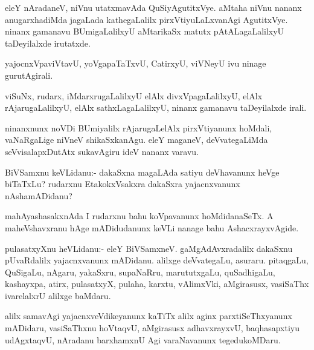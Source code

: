 \documentclass{article}
\begin{document}
\begin{mn}%
eleY nAradaneV, niVnu utatxmavAda QuSiyAgutitxVye. aMtaha niVnu nananx
anugarxhadiMda jagaLada kathegaLalilx pirxVtiyuLaLxvanAgi
AgutitxVye. ninanx gamanavu BUmigaLalilxyU aMtarikaSx matutx
pAtALagaLalilxyU taDeyilalxde irutatxde.
\end{mn}

\begin{mn}%
yajocnxVpaviVtavU, yoVgapaTaTxvU, CatirxyU, viVNeyU ivu ninage gurutAgirali.
\end{mn}

\begin{mn}
viSuNx, rudarx, iMdarxrugaLalilxyU elAlx divxVpagaLalilxyU, elAlx
rAjarugaLalilxyU, elAlx sathxLagaLalilxyU, ninanx gamanavu
taDeyilalxde irali.
\end{mn}

\begin{mn}
ninanxnunx noVDi BUmiyalilx rAjarugaLelAlx pirxVtiyanunx hoMdali,
vaNaRgaLige niVneV shikaSxkanAgu. eleY maganeV, deVvategaLiMda
seVvisalapxDutAtx sukavAgiru ideV nananx varavu.
\end{mn}

%
%


\begin{mn}%
BiVSamxnu keVLidanu:- dakaSxna magaLAda satiyu deVhavanunx heVge
biTaTxLu? rudarxnu EtakokxVsakxra dakaSxra yajacnxvanunx nAshamADidanu?
\end{mn}

\begin{mn}
mahAyashasakxnAda I rudarxnu bahu koVpavanunx hoMdidanaSeTx. A
maheVshavxranu hAge mADidudanunx keVLi nanage bahu AshacxrayxvAgide.
\end{mn}

\begin{mn}
pulasatxyXnu heVLidanu:- eleY BiVSamxneV. gaMgAdAvxradalilx dakaSxnu
pUvaRdalilx yajacnxvanunx mADidanu. alilxge deVvategaLu,
asuraru. pitaqgaLu, QuSigaLu, nAgaru, yakaSxru, supaNaRru,
marututxgaLu, quSadhigaLu, kashayxpa, atirx, pulasatxyX, pulaha,
karxtu, vAlimxVki, aMgirasusx, vasiSaThx ivarelalxrU alilxge baMdaru.
\end{mn}

\begin{mn}%
alilx samavAgi yajacnxveVdikeyanunx kaTiTx alilx aginx
parxtiSeThxyanunx mADidaru, vasiSaThxnu hoVtaqvU, aMgirasusx
adhavxrayxvU, baqhasapxtiyu udAgxtaqvU, nAradanu barxhamxnU Agi
varaNavanunx tegedukoMDaru.
\end{mn}
\end{document}
